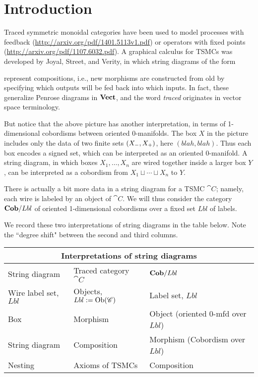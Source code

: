 \chapter{Introduction}

Traced symmetric monoidal categories have been used to model processes with feedback (\url{http://arxiv.org/pdf/1401.5113v1.pdf})  or operators with fixed points (\url{http://arxiv.org/pdf/1107.6032.pdf}). A graphical calculus for TSMCs was developed by Joyal, Street, and Verity, in which string diagrams of the form
\begin{center}\end{center}
represent compositions, i.e., new morphisms are constructed from old by specifying which outputs will be fed back into which inputs. In fact, these generalize Penrose diagrams in $\mathbf{Vect}$, and the word \emph{traced} originates in vector space terminology.  

But notice that the above picture has another interpretation, in terms of 1-dimensional cobordisms between oriented 0-manifolds. The box $X$ in the picture includes only the data of two finite sets $({X_-},{X_+})$, here $(blah,blah)$. Thus each box encodes a signed set, which can be interpreted as an oriented 0-manifold. A string diagram, in which boxes $X_1,\ldots,X_n$ are wired together inside a larger box $Y$, can be interpreted as a cobordism from $X_1\sqcup\cdots\sqcup X_n$ to $Y$. 

There is actually a bit more data in a string diagram for a TSMC $\cat{C}$; namely, each wire is labeled by an object of $\cat{C}$. We will thus consider the category $\mathbf{Cob}/Lbl$ of oriented 1-dimensional cobordisms over a fixed set $Lbl$ of labels. 

We record these two interpretations of string diagrams in the table below. Note the ``degree shift" between the second and third columns.
\begin{center}
\begin{tabular}{| l | l | l |}
\hline
\multicolumn{3}{|c|}{Interpretations of string diagrams}\\\hline
String diagram & Traced category $\cat{C}$ & $\mathbf{Cob}/Lbl$\\\bhline
Wire label set, $Lbl$&Objects, $Lbl:=\operatorname{Ob}(\mathscr{C})$&Label set, $Lbl$\\
Box & Morphism & Object (oriented 0-mfd over $Lbl$)\\
String diagram & Composition & Morphism (Cobordism over $Lbl$)\\
Nesting & Axioms of TSMCs & Composition\\\hline
\end{tabular}
\end{center}

